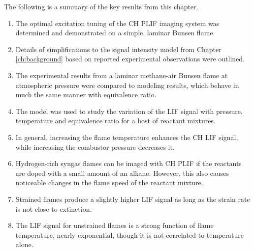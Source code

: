 The following is a summary of the key results from this chapter.

\begin{enumerate}
  \item The optimal excitation tuning of the CH PLIF imaging system was determined and demonstrated on a simple, laminar Bunsen flame.
  \item Details of simplifications to the signal intensity model from Chapter \ref{ch:background} based on reported experimental observations were outlined.
  \item The experimental results from a laminar methane-air Bunsen flame at atmospheric pressure were compared to modeling results, which behave in much the same manner with equivalence ratio.
  \item The model was used to study the variation of the LIF signal with pressure, temperature and equivalence ratio for a host of reactant mixtures.
  \item In general, increasing the flame temperature enhances the CH LIF signal, while increasing the combustor pressure decreases it.
  \item Hydrogen-rich syngas flames can be imaged with CH PLIF if the reactants are doped with a small amount of an alkane.
    However, this also causes noticeable changes in the flame speed of the reactant mixture.
  \item Strained flames produce a slightly higher LIF signal as long as the strain rate is not close to extinction.
  \item The LIF signal for unstrained flames is a strong function of flame temperature, nearly exponential, though it is not correlated to temperature alone.
\end{enumerate}
